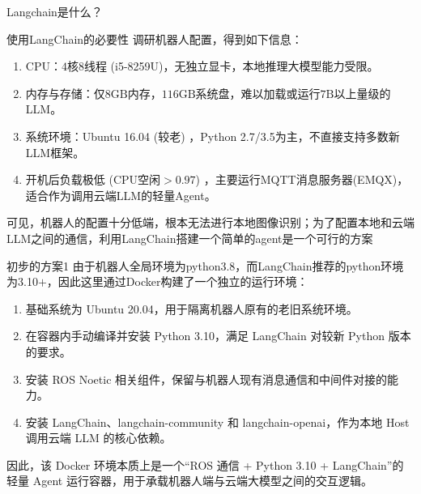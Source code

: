 \documentclass{beamer}
\begin{document}
\begin{frame}{Langchain是什么？}
\begin{center}
{
        }
    \end{center}
    \end{frame}

    \begin{frame}{使用LangChain的必要性}
        调研机器人配置，得到如下信息：
        \begin{enumerate}
            \item[(1).] CPU：$4$核$8$线程 (i5-8259U)，无独立显卡，本地推理大模型能力受限。
            \item[(2).] 内存与存储：仅$8\text{GB}$内存，$116\text{GB}$系统盘，难以加载或运行$7\text{B}$以上量级的LLM。
            \item[(3).] 系统环境：Ubuntu 16.04 (较老) ，Python 2.7/3.5为主，不直接支持多数新LLM框架。
            \item[(4).] 开机后负载极低 (CPU空闲$> 0.97$) ，主要运行MQTT消息服务器(EMQX)，适合作为调用云端LLM的轻量Agent。
        \end{enumerate}

        可见，机器人的配置十分低端，根本无法进行本地图像识别；为了配置本地和云端LLM之间的通信，利用LangChain搭建一个简单的agent是一个可行的方案

    \end{frame}

    \begin{frame}{初步的方案1}
        由于机器人全局环境为python3.8，而LangChain推荐的python环境为3.10$+$，因此这里通过Docker构建了一个独立的运行环境：
        \begin{enumerate}
            \item[(1).] 基础系统为 Ubuntu 20.04，用于隔离机器人原有的老旧系统环境。
            \item[(2).] 在容器内手动编译并安装 Python 3.10，满足 LangChain 对较新 Python 版本的要求。
            \item[(3).] 安装 ROS Noetic 相关组件，保留与机器人现有消息通信和中间件对接的能力。
            \item[(4).] 安装 LangChain、langchain-community 和 langchain-openai，作为本地 Host 调用云端 LLM 的核心依赖。
        \end{enumerate}
        因此，该 Docker 环境本质上是一个“ROS 通信 + Python 3.10 + LangChain”的轻量 Agent 运行容器，用于承载机器人端与云端大模型之间的交互逻辑。
    \end{frame}
\end{document}
